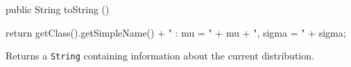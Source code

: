\begin{htmlonly}
\end{htmlonly}
\begin{code}

   public String toString ()\begin{hide} {
      return getClass().getSimpleName() + " : mu = " + mu + ", sigma = " + sigma;
   }\end{hide}
\end{code}
\begin{tabb}
   Returns a \texttt{String} containing information about the current distribution.
\end{tabb}
\begin{htmlonly}
\end{htmlonly}
\begin{code}\begin{hide}
}\end{hide}
\end{code}
